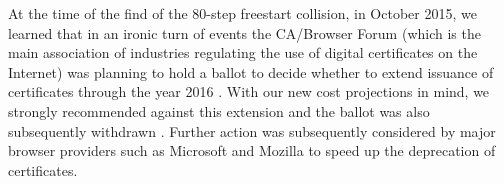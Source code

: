 \medskip

At the time of the find of the 80-step freestart collision, in October 2015, we learned that in an ironic turn of events the CA/Browser Forum (which is the main association of industries regulating the use of digital certificates on the Internet)
was planning to hold a ballot to decide whether to extend issuance of \shaone certificates through the year 2016 \cite{cabforum}.
With our new cost projections in mind, we strongly recommended against this extension and the ballot was also subsequently withdrawn \cite{cabforum2}.
Further action was subsequently considered by major browser providers such as Microsoft \cite{MS_sha} and Mozilla \cite{Moz_sha} to speed up the deprecation of \shaone certificates.
